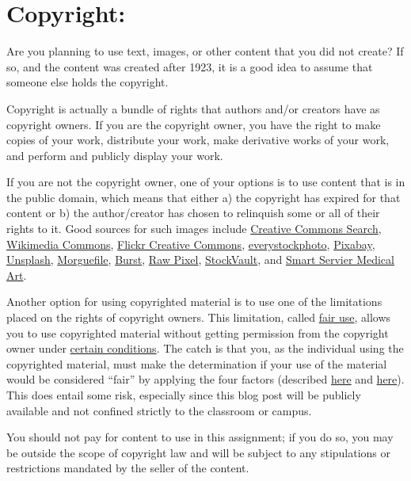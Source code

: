 \documentclass[11pt]{article}
\begin{document}
\newpage
\section*{Copyright:}
Are you planning to use text, images, or other content that you did not create? 
If so, and the content was created after 1923, it is a good idea to assume that someone else holds the copyright.

Copyright is actually a bundle of rights that authors and/or creators have as copyright owners. 
If you are the copyright owner, you have the right to make copies of your work, distribute your work, make derivative works of your work, and perform and publicly display your work.

If you are not the copyright owner, one of your options is to use content that is in the public domain, which means that either a) the copyright has expired for that content or b) the author/creator has chosen to relinquish some or all of their rights to it. Good sources for such images include 
\href{https://search.creativecommons.org/search}{Creative Commons Search},
\href{https://commons.wikimedia.org/wiki/Main_Page}{Wikimedia Commons}, 
\href{https://www.flickr.com/creativecommons}{Flickr Creative Commons}, 
\href{http://www.everystockphoto.com/}{everystockphoto}, 
\href{https://pixabay.com/en/}{Pixabay}, 
\href{https://unsplash.com/}{Unsplash},
\href{https://morguefile.com/photos}{Morguefile},
\href{https://burst.shopify.com/}{Burst},
\href{https://www.rawpixel.com/}{Raw Pixel}, 
\href{https://www.stockvault.net/}{StockVault}, and
\href{https://smart.servier.com/}{Smart Servier Medical Art}.  

Another option for using copyrighted material is to use one of the limitations placed on the rights of copyright owners. 
This limitation, called \href{https://www.lib.umn.edu/copyright/fairuse}{fair use},  allows you to use copyrighted material without getting permission from the copyright owner under \href{https://www.lib.umn.edu/copyright/fairuse}{certain conditions}. 
The catch is that you, as the individual using the copyrighted material, must make the determination if your use of the material would be considered ``fair'' by applying the four factors (described \href{https://www.lib.umn.edu/copyright/fairuse}{here} and \href{https://www.law.cornell.edu/uscode/text/17/107}{here}). 
This does entail some risk, especially since this blog post will be publicly available and not confined strictly to the classroom or campus.

You should not pay for content to use in this assignment; if you do so, you may be outside the scope of copyright law and will be subject to any stipulations or restrictions mandated by the seller of the content.
\end{document}
